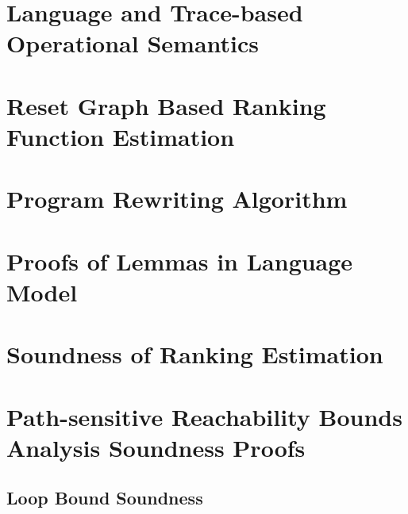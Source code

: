 \section{Language and Trace-based Operational Semantics}
\label{apdx:language}

\clearpage

\section{Reset Graph Based Ranking Function Estimation}
\label{apdx:alg-resetgraph}

\clearpage

\section{Program Rewriting Algorithm}
\label{apdx:alg-rewrite}

\clearpage


% 

\section{Proofs of Lemmas in Language Model}
\label{apdx:lem_language}

\clearpage
% 
\section{Soundness of Ranking Estimation}
\label{apdx:pathinsensitive_rb_soundness}

\clearpage

\section{Path-sensitive Reachability Bounds Analysis Soundness Proofs}
\label{apdx:pathsensitive_rb_soundness}

\subsection{Loop Bound Soundness}
\label{apdx:loopbound-sound}

\clearpage

